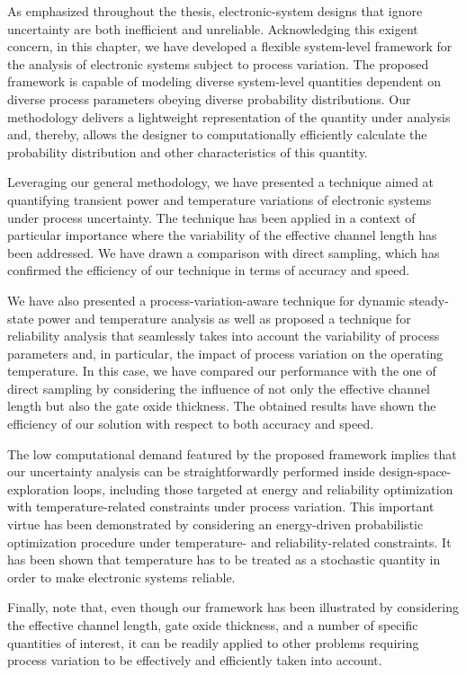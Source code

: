 As emphasized throughout the thesis, electronic-system designs that ignore
uncertainty are both inefficient and unreliable. Acknowledging this exigent
concern, in this chapter, we have developed a flexible system-level framework
for the analysis of electronic systems subject to process variation. The
proposed framework is capable of modeling diverse system-level quantities
dependent on diverse process parameters obeying diverse probability
distributions. Our methodology delivers a lightweight representation of the
quantity under analysis and, thereby, allows the designer to computationally
efficiently calculate the probability distribution and other characteristics of
this quantity.

Leveraging our general methodology, we have presented a technique aimed at
quantifying transient power and temperature variations of electronic systems
under process uncertainty. The technique has been applied in a context of
particular importance where the variability of the effective channel length has
been addressed. We have drawn a comparison with direct sampling, which has
confirmed the efficiency of our technique in terms of accuracy and speed.

We have also presented a process-variation-aware technique for dynamic
steady-state power and temperature analysis as well as proposed a technique for
reliability analysis that seamlessly takes into account the variability of
process parameters and, in particular, the impact of process variation on the
operating temperature. In this case, we have compared our performance with the
one of direct sampling by considering the influence of not only the effective
channel length but also the gate oxide thickness. The obtained results have
shown the efficiency of our solution with respect to both accuracy and speed.

The low computational demand featured by the proposed framework implies that our
uncertainty analysis can be straightforwardly performed inside
design-space-exploration loops, including those targeted at energy and
reliability optimization with temperature-related constraints under process
variation. This important virtue has been demonstrated by considering an
energy-driven probabilistic optimization procedure under temperature- and
reliability-related constraints. It has been shown that temperature has to be
treated as a stochastic quantity in order to make electronic systems reliable.

Finally, note that, even though our framework has been illustrated by
considering the effective channel length, gate oxide thickness, and a number of
specific quantities of interest, it can be readily applied to other problems
requiring process variation to be effectively and efficiently taken into
account.

